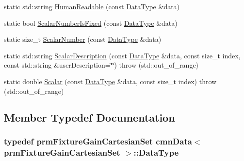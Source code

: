 \begin{DoxyCompactItemize}
\item 
static std\+::string \hyperlink{classcmn_data_3_01prm_fixture_gain_cartesian_set_01_4_a8ba414fbdc7eddcb915dcf54f9168201}{Human\+Readable} (const \hyperlink{classcmn_data_3_01prm_fixture_gain_cartesian_set_01_4_acc465bb24d169f220385b16e38a8e7ea}{Data\+Type} \&data)
\item 
static bool \hyperlink{classcmn_data_3_01prm_fixture_gain_cartesian_set_01_4_a2a449144596cb816b46b1fdacf6480ea}{Scalar\+Number\+Is\+Fixed} (const \hyperlink{classcmn_data_3_01prm_fixture_gain_cartesian_set_01_4_acc465bb24d169f220385b16e38a8e7ea}{Data\+Type} \&data)
\item 
static size\+\_\+t \hyperlink{classcmn_data_3_01prm_fixture_gain_cartesian_set_01_4_ad0e24bf44b0afb6895d09e817cfe85ec}{Scalar\+Number} (const \hyperlink{classcmn_data_3_01prm_fixture_gain_cartesian_set_01_4_acc465bb24d169f220385b16e38a8e7ea}{Data\+Type} \&data)
\item 
static std\+::string \hyperlink{classcmn_data_3_01prm_fixture_gain_cartesian_set_01_4_a02f2135145799af3c1fe4cfd641bb224}{Scalar\+Description} (const \hyperlink{classcmn_data_3_01prm_fixture_gain_cartesian_set_01_4_acc465bb24d169f220385b16e38a8e7ea}{Data\+Type} \&data, const size\+\_\+t index, const std\+::string \&user\+Description=\char`\"{}\char`\"{})  throw (std\+::out\+\_\+of\+\_\+range)
\item 
static double \hyperlink{classcmn_data_3_01prm_fixture_gain_cartesian_set_01_4_aea6db6f4eeeae19a34885ddc87f43624}{Scalar} (const \hyperlink{classcmn_data_3_01prm_fixture_gain_cartesian_set_01_4_acc465bb24d169f220385b16e38a8e7ea}{Data\+Type} \&data, const size\+\_\+t index)  throw (std\+::out\+\_\+of\+\_\+range)
\end{DoxyCompactItemize}


\subsection{Member Typedef Documentation}
\hypertarget{classcmn_data_3_01prm_fixture_gain_cartesian_set_01_4_acc465bb24d169f220385b16e38a8e7ea}{}
\subsubsection[{Data\+Type}]{\setlength{\rightskip}{0pt plus 5cm}typedef {\bf prm\+Fixture\+Gain\+Cartesian\+Set} {\bf cmn\+Data}$<$ {\bf prm\+Fixture\+Gain\+Cartesian\+Set} $>$\+::{\bf Data\+Type}}\label{classcmn_data_3_01prm_fixture_gain_cartesian_set_01_4_acc465bb24d169f220385b16e38a8e7ea}


